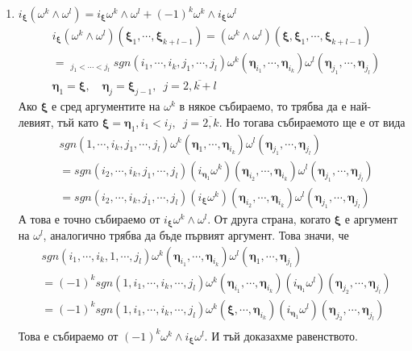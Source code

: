 \documentclass[12pt]{article}
\newcommand\myxi[0]{\boldsymbol{\xi}}
\newcommand\myeta[0]{\boldsymbol{\eta}}
\begin{document}
\begin{large}
\begin{enumerate}
\item $i_{\myxi}(\omega^k \wedge \omega^l)=i_{\myxi}\omega^k \wedge \omega^l + (-1)^k \omega^k \wedge i_{\myxi}\omega^l$
\begin{align*}
&i_{\myxi}(\omega^k \wedge \omega^l)(\myxi_1,\cdots,\myxi_{k+l-1}) 
=(\omega^k \wedge \omega^l)(\myxi,\myxi_1,\cdots,\myxi_{k+l-1}) \\
&=\mathop{\sum_{i_1<\cdots<i_k}}_{j_1<\cdots<j_l} sgn(i_1,\cdots,i_k,j_1, \cdots,j_l)\omega^k(\myeta_{i_1},\cdots,\myeta_{i_k})\omega^l(\myeta_{j_1},\cdots,\myeta_{j_l}) \\
&\myeta_1=\myxi, \quad \myeta_j=\myxi_{j-1}, \enspace j=\overline{2,k+l}
\end{align*}
Ако $\myxi$ е сред аргументите на $\omega^k$ в някое събираемо, то трябва да е най-левият, тъй като $\myxi=\myeta_1, i_1<i_j, \enspace j=\overline{2,k}$. Но тогава събираемото ще е от вида
\begin{align*}
&sgn(1,\cdots,i_k,j_1, \cdots,j_l)\omega^k(\myeta_1,\cdots,\myeta_{i_k})\omega^l(\myeta_{j_1},\cdots,\myeta_{j_l}) \\
&=sgn(i_2,\cdots,i_k,j_1, \cdots,j_l) (i_{\myeta_1}\omega^k)(\myeta_{i_2},\cdots,\myeta_{i_k})\omega^l(\myeta_{j_1},\cdots,\myeta_{j_l}) \\
&=sgn(i_2,\cdots,i_k,j_1, \cdots,j_l) (i_{\myxi}\omega^k)(\myeta_{i_2},\cdots,\myeta_{i_k})\omega^l(\myeta_{j_1},\cdots,\myeta_{j_l}) 
\end{align*}
А това е точно събираемо от $i_{\myxi}\omega^k \wedge \omega^l$. От друга страна, когато $\myxi$ е аргумент на $\omega^l$, аналогично трябва да бъде първият аргумент. Това значи, че
\begin{align*}
&sgn(i_1,\cdots,i_k,1, \cdots,j_l)\omega^k(\myeta_{i_1},\cdots,\myeta_{i_k})\omega^l(\myeta_1,\cdots,\myeta_{j_l}) \\
&=(-1)^k sgn(1,i_1,\cdots,i_k, \cdots,j_l) \omega^k(\myeta_{i_1},\cdots,\myeta_{i_k})(i_{\myeta_1}\omega^l)(\myeta_{j_2},\cdots,\myeta_{j_l}) \\
&=(-1)^k sgn(1,i_1,\cdots,i_k, \cdots,j_l) \omega^k(\myxi,\cdots,\myeta_{i_k})(i_{\myeta_1}\omega^l)(\myeta_{j_2},\cdots,\myeta_{j_l}) \\
\end{align*}
Това е събираемо от $(-1)^k \omega^k \wedge i_{\myxi}\omega^l$. И тъй доказахме равенството.
\end{enumerate}


\end{large}
\end{document}

